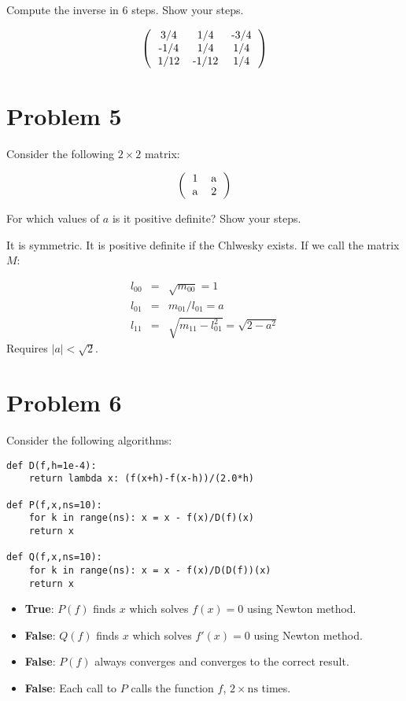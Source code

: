 \documentclass[12pt]{article}
\begin{document}
\noindent Compute the inverse in 6 steps. Show your steps.

\[
\left(
\begin{tabular}{ccc}
3/4 & 1/4 & -3/4 \\
-1/4 & 1/4 & 1/4 \\
1/12 & -1/12 & 1/4
\end{tabular}
\right)
\]

\newpage\section{Problem 5}

\noindent Consider the following $2 \times 2$ matrix:

\[
\left(
\begin{tabular}{cc}
1 & a \\
a & 2 
\end{tabular}
\right)
\]

\noindent For which values of $a$ is it positive definite? Show your steps.

It is symmetric. It is positive definite if the Chlwesky exists. If we call the matrix $M$:

\begin{eqnarray}
l_{00} &=& \sqrt{m_{00}} = 1\\
l_{01} &=& m_{01}/l_{01} = a\\
l_{11} &=& \sqrt{m_{11}-l_{01}^2} = \sqrt{2-a^2}
\end{eqnarray}
Requires $|a|<\sqrt{2}$.


\newpage\section{Problem 6}

\noindent Consider the following algorithms:

\begin{verbatim}
def D(f,h=1e-4):
    return lambda x: (f(x+h)-f(x-h))/(2.0*h)

def P(f,x,ns=10):
    for k in range(ns): x = x - f(x)/D(f)(x)
    return x

def Q(f,x,ns=10):
    for k in range(ns): x = x - f(x)/D(D(f))(x)
    return x
\end{verbatim}

\begin{itemize}
\item {\bf True}: $P(f)$ finds $x$ which solves $f(x)=0$ using Newton method.
\item {\bf False}: $Q(f)$ finds $x$ which solves $f'(x)=0$ using Newton method.
\item {\bf False}: $P(f)$ always converges and converges to the correct result.
\item {\bf False}: Each call to $P$ calls the function $f$, $2\times\mathrm{ns}$ times.
\end{itemize}
\end{document}
